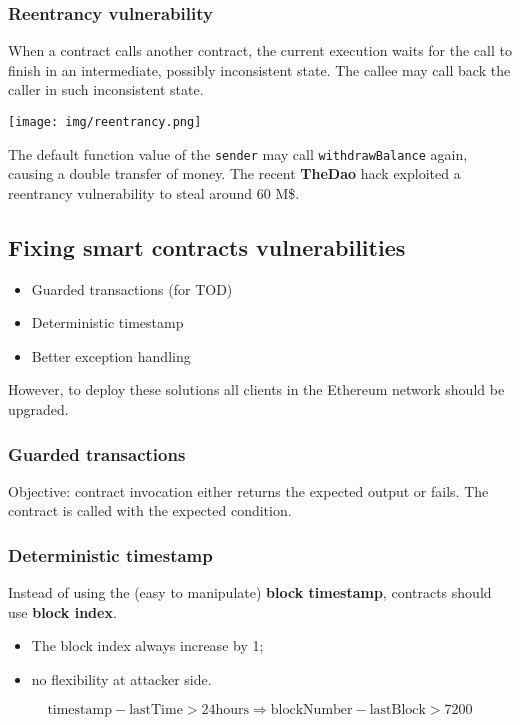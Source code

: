 \documentclass[a4paper, 10pt, titlepage]{article}
\begin{document}
\subsubsection{Reentrancy vulnerability}
When a contract calls another contract, the current execution waits for the call to finish in an intermediate, possibly inconsistent state. The callee may call back the caller in such inconsistent state. 
\begin{center}
\texttt{[image: img/reentrancy.png]}
\end{center}
The default function value of the \lstinline|sender| may call \lstinline|withdrawBalance| again, causing a double transfer of money. The recent \textbf{TheDao} hack exploited a reentrancy vulnerability to steal around 60 M\$.

\subsection{Fixing smart contracts vulnerabilities}
\begin{itemize}
\item Guarded transactions (for TOD)
\item Deterministic timestamp
\item Better exception handling
\end{itemize}
However, to deploy these solutions all clients in the Ethereum network should be upgraded.

\subsubsection{Guarded transactions}
Objective: contract invocation either returns the expected output or fails. The contract is called with the expected condition.

\subsubsection{Deterministic timestamp}
Instead of using the (easy to manipulate) \textbf{block timestamp}, contracts should use \textbf{block index}. 
\begin{itemize}
\item The block index always increase by 1;
\item no flexibility at attacker side.
\end{itemize}
$$\text{timestamp} - \text{lastTime} > 24 \text{hours} \Rightarrow \text{blockNumber} - \text{lastBlock} > 7200$$
\end{document}
